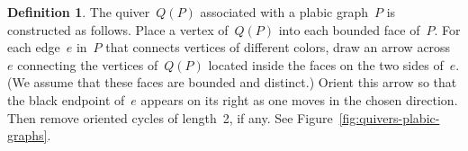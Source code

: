 \documentclass[10pt]{amsart}
\theoremstyle{definition}
\newtheorem{definition}[theorem]{Definition}
\begin{document}
\begin{definition}
\label{def:Q(P)}
The quiver~$Q(P)$ associated with a plabic graph~$P$ is constructed as follows.
Place a vertex of~$Q(P)$ into each bounded face of~$P$.
For each edge~$e$ in~$P$ that connects vertices of different colors,
draw an arrow across~$e$ connecting the vertices of~$Q(P)$ located inside the faces 
on the two sides of~$e$. (We assume that these faces are bounded and distinct.) 
Orient this arrow so that the black endpoint of~$e$ appears on its right as one moves
in the chosen direction. 
Then remove oriented cycles of length~2, if any. 
See Figure~\ref{fig:quivers-plabic-graphs}.
\end{definition}

\end{document}

